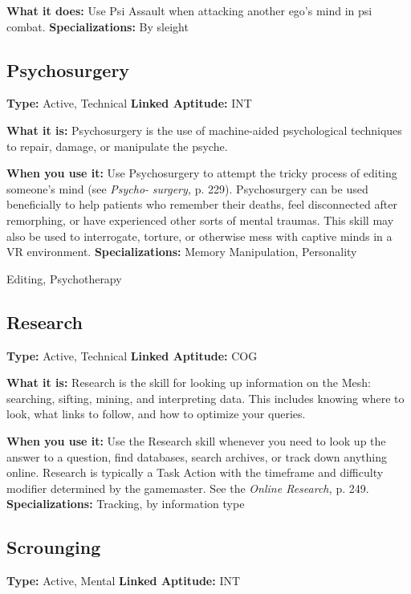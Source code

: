 \textbf{What it does:} Use Psi Assault when attacking another
ego's mind in psi combat.
\textbf{Specializations:} By sleight

\subsection{Psychosurgery}

\textbf{Type:} Active, Technical
\textbf{Linked Aptitude:} INT

\textbf{What it is:} Psychosurgery is the use of machine-aided
psychological techniques to repair, damage, or
manipulate the psyche.

\textbf{When you use it:} Use Psychosurgery to attempt the 
tricky process of editing someone's mind (see \textit{Psycho-}
\textit{surgery,} p. 229). Psychosurgery can be used beneficially
to help patients who remember their deaths, feel
disconnected after remorphing, or have experienced 
other sorts of mental traumas. This skill may also be 
used to interrogate, torture, or otherwise mess with 
captive minds in a VR environment.
\textbf{Specializations:} Memory Manipulation, Personality 

Editing, Psychotherapy

\subsection{Research}

\textbf{Type:} Active, Technical
\textbf{Linked Aptitude:} COG

\textbf{What it is:} Research is the skill for looking up information
on the Mesh: searching, sifting, mining, and
interpreting data. This includes knowing where to look, 
what links to follow, and how to optimize your queries.

\textbf{When you use it:} Use the Research skill whenever 
you need to look up the answer to a question, find 
databases, search archives, or track down anything 
online. Research is typically a Task Action with the 
timeframe and difficulty modifier determined by the 
gamemaster. See the \textit{Online Research,} p. 249.
\textbf{Specializations:} Tracking, by information type

\subsection{Scrounging}

\textbf{Type:} Active, Mental
\textbf{Linked Aptitude:} INT

